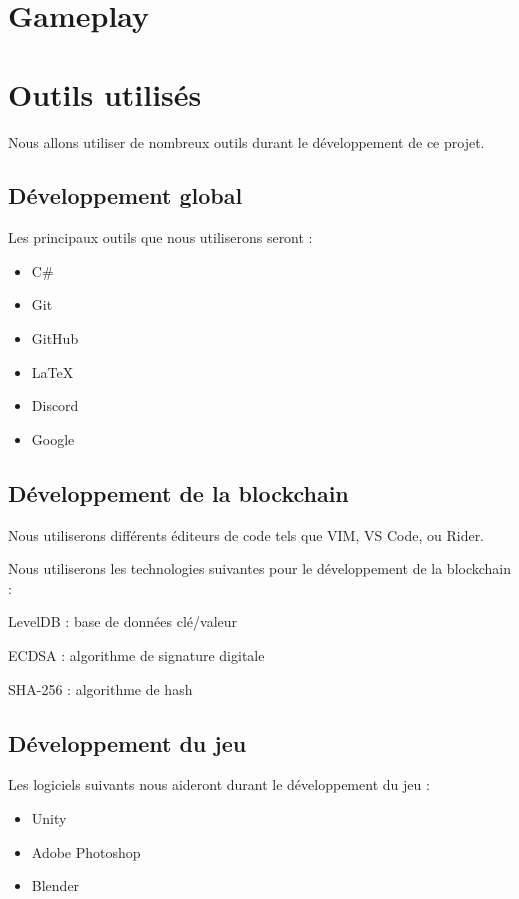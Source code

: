 \documentclass{article}
\begin{document}
\section{Gameplay}

\section{Outils utilisés}
Nous allons utiliser de nombreux outils durant le développement de ce projet.

\subsection{Développement global}
Les principaux outils que nous utiliserons seront :

\begin{itemize}
    \item C\#
    \item Git
    \item GitHub
    \item \LaTeX
    \item Discord
    \item Google

\end{itemize}

\subsection{Développement de la blockchain}
Nous utiliserons différents éditeurs de code tels que VIM, VS Code, ou Rider.

Nous utiliserons les technologies suivantes pour le développement de la blockchain :
\begin{itemize}
\begin{samepage}
    \item LevelDB : base de données clé/valeur
    \item ECDSA : algorithme de signature digitale
    \item SHA-256 : algorithme de hash
\end{samepage}
\end{itemize}

\subsection{Développement du jeu}

Les logiciels suivants nous aideront durant le développement du jeu :
\begin{itemize}
    \item Unity
    \item Adobe Photoshop
    \item Blender
\end{itemize}
\end{document}
